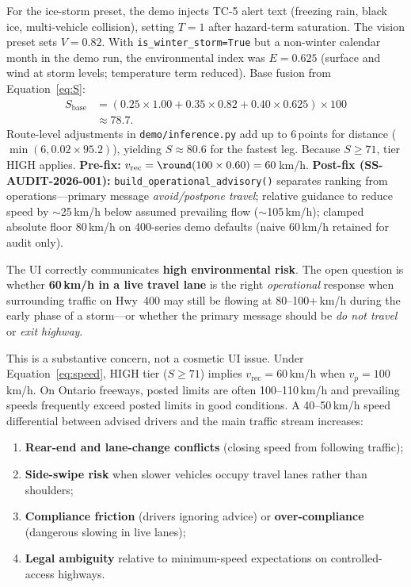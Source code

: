 \documentclass[11pt,a4paper]{article}
\begin{document}
For the ice-storm preset, the demo injects TC-5 alert text (freezing rain, black ice, multi-vehicle collision), setting $T=1$ after hazard-term saturation. The vision preset sets $V=0.82$. With \texttt{is\_winter\_storm=True} but a non-winter calendar month in the demo run, the environmental index was $E=0.625$ (surface and wind at storm levels; temperature term reduced). Base fusion from Equation~\eqref{eq:S}:
\begin{align*}
  S_{\text{base}} &= (0.25 \times 1.00 + 0.35 \times 0.82 + 0.40 \times 0.625) \times 100 \\
                  &\approx 78.7 .
\end{align*}
Route-level adjustments in \texttt{demo/inference.py} add up to 6\,points for distance ($\min(6, 0.02 \times 95.2)$), yielding $S \approx 80.6$ for the fastest leg. Because $S \geq 71$, tier HIGH applies. \textbf{Pre-fix:} $v_{\text{rec}} = \round(100 \times 0.60) = 60$\,km/h. \textbf{Post-fix (SS-AUDIT-2026-001):} \texttt{build\_operational\_advisory()} separates ranking from operations---primary message \emph{avoid/postpone travel}; relative guidance to reduce speed by $\sim$25\,km/h below assumed prevailing flow ($\sim$105\,km/h); clamped absolute floor 80\,km/h on 400-series demo defaults (naive 60\,km/h retained for audit only).

The UI correctly communicates \textbf{high environmental risk}. The open question is whether \textbf{60\,km/h in a live travel lane} is the right \emph{operational} response when surrounding traffic on Hwy~400 may still be flowing at 80--100+\,km/h during the early phase of a storm---or whether the primary message should be \emph{do not travel} or \emph{exit highway}.

This is a substantive concern, not a cosmetic UI issue. Under Equation~\eqref{eq:speed}, HIGH tier ($S \geq 71$) implies $v_{\text{rec}} = 60$\,km/h when $v_p = 100$\,km/h. On Ontario freeways, posted limits are often 100--110\,km/h and prevailing speeds frequently exceed posted limits in good conditions. A 40--50\,km/h speed differential between advised drivers and the main traffic stream increases:
\begin{enumerate}[noitemsep]
  \item \textbf{Rear-end and lane-change conflicts} (closing speed from following traffic);
  \item \textbf{Side-swipe risk} when slower vehicles occupy travel lanes rather than shoulders;
  \item \textbf{Compliance friction} (drivers ignoring advice) or \textbf{over-compliance} (dangerous slowing in live lanes);
  \item \textbf{Legal ambiguity} relative to minimum-speed expectations on controlled-access highways.
\end{enumerate}
\end{document}
